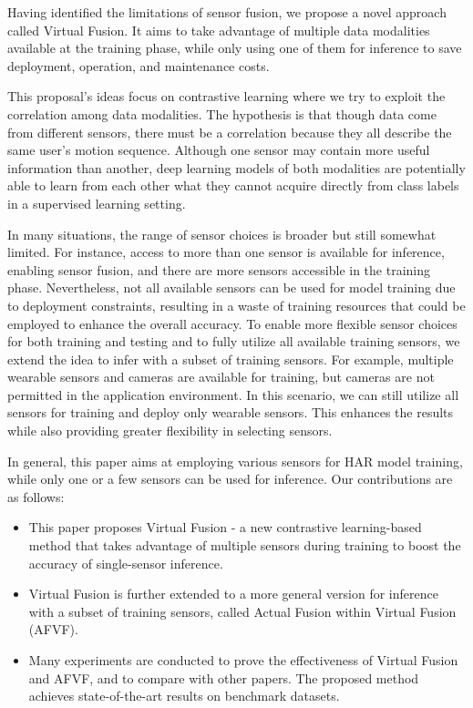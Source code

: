 \documentclass[conference]{IEEEtran}
\begin{document}
Having identified the limitations of sensor fusion, we propose a novel approach called Virtual Fusion. It aims to take advantage of multiple data modalities available at the training phase, while only using one of them for inference to save deployment, operation, and maintenance costs.

This proposal's ideas focus on contrastive learning where we try to exploit the correlation among data modalities. The hypothesis is that though data come from different sensors, there must be a correlation because they all describe the same user's motion sequence. Although one sensor may contain more useful information than another, deep learning models of both modalities are potentially able to learn from each other what they cannot acquire directly from class labels in a supervised learning setting.

In many situations, the range of sensor choices is broader but still somewhat limited. For instance, access to more than one sensor is available for inference, enabling sensor fusion, and there are more sensors accessible in the training phase. Nevertheless, not all available sensors can be used for model training due to deployment constraints, resulting in a waste of training resources that could be employed to enhance the overall accuracy. To enable more flexible sensor choices for both training and testing and to fully utilize all available training sensors, we extend the idea to infer with a subset of training sensors. For example, multiple wearable sensors and cameras are available for training, but cameras are not permitted in the application environment. In this scenario, we can still utilize all sensors for training and deploy only wearable sensors. This enhances the results while also providing greater flexibility in selecting sensors.

In general, this paper aims at employing various sensors for HAR model training, while only one or a few sensors can be used for inference. Our contributions are as follows:
\begin{itemize}
    \item This paper proposes Virtual Fusion - a new contrastive learning-based method that takes advantage of multiple sensors during training to boost the accuracy of single-sensor inference.
    \item Virtual Fusion is further extended to a more general version for inference with a subset of training sensors, called Actual Fusion within Virtual Fusion (AFVF).
    \item Many experiments are conducted to prove the effectiveness of Virtual Fusion and AFVF, and to compare with other papers. The proposed method achieves state-of-the-art results on benchmark datasets.
\end{itemize}
\end{document}
